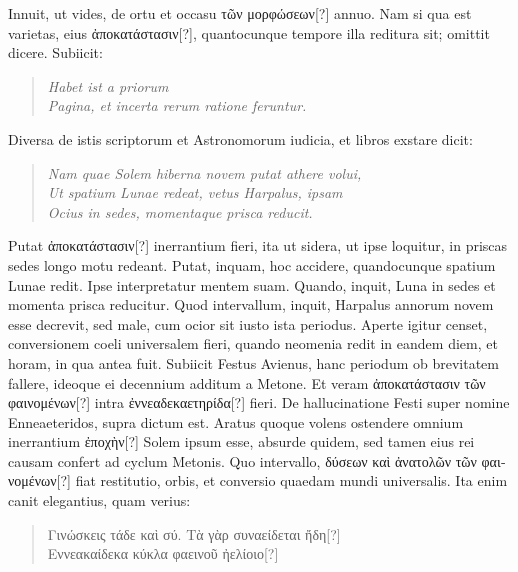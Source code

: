 Innuit, ut vides, de ortu et occasu
 \textgreek{τῶν μορφώσεων[?]} annuo.
Nam si qua
est varietas, eius \textgreek{ἀποκατάστασιν[?]},
 quantocunque tempore illa reditura
sit; omittit dicere.
Subiicit:
\begin{verse}
  \textit{\emd{} Habet ist a priorum\\
  Pagina, et incerta rerum ratione feruntur.}
\end{verse}
Diversa de istis scriptorum et Astronomorum iudicia, et libros exstare
dicit:
\begin{verse}
  \textit{Nam quae Solem hiberna novem putat athere volui,\\
  Ut spatium Lunae redeat, vetus Harpalus, ipsam\\
  Ocius in sedes, momentaque prisca reducit.}
\end{verse}
Putat \textgreek{ἀποκατάστασιν[?]} inerrantium fieri, ita ut sidera,
 ut ipse loquitur, in
priscas sedes longo motu redeant.
Putat, inquam, hoc accidere, quandocunque
spatium Lunae redit.
Ipse interpretatur mentem suam.
Quando, inquit, Luna in sedes et momenta prisca reducitur.
Quod
intervallum, inquit, Harpalus annorum novem esse decrevit, sed
male, cum ocior sit iusto ista periodus.
Aperte igitur censet, conversionem
coeli universalem fieri, quando neomenia redit in eandem
diem, et horam, in qua antea fuit.
Subiicit Festus Avienus, hanc periodum
ob brevitatem fallere, ideoque ei decennium additum a
Metone.
%
Et veram \textgreek{ἀποκατάστασιν τῶν φαινομένων[?]}
 intra \textgreek{ἐννεαδεκαετηρίδα[?]}
fieri.
De hallucinatione Festi super nomine Enneaeteridos, supra
dictum est.
Aratus quoque volens ostendere omnium inerrantium
\textgreek{ἐποχὴν[?]} Solem ipsum esse, absurde quidem, sed tamen eius
rei causam confert ad cyclum Metonis.
Quo intervallo, \textgreek{δύσεων καὶ ἀνατολῶν τῶν φαινομένων[?]}
fiat restitutio, orbis, et conversio quaedam
mundi universalis.
Ita enim canit elegantius, quam verius:
\begin{verse}
  \textgreek{Γινώσκεις τάδε καὶ σύ. Τὰ γὰρ συναείδεται ἤδη[?]}\\
  \textgreek{Εννεακαίδεκα κύκλα φαεινοῦ ἠελίοιο[?]}\\
\end{verse}
